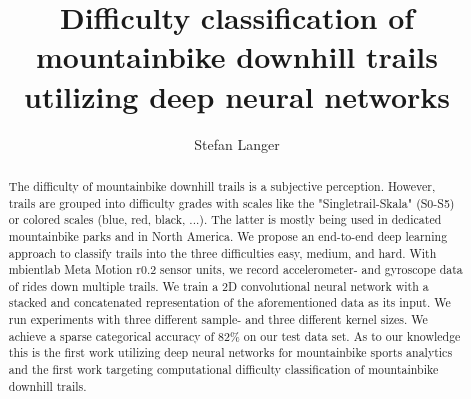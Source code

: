 \documentclass[runningheads]{llncs}
\begin{document}
%
\title{Difficulty classification of mountainbike downhill trails utilizing deep neural networks}
%
%
\author{Stefan Langer}
%
%
%
\maketitle              %
%
\begin{abstract}
The difficulty of mountainbike downhill trails is a subjective perception. 
However, trails are grouped into difficulty grades with scales like the "Singletrail-Skala" (S0-S5) or  colored scales (blue, red, black, ...).
The latter is mostly being used in dedicated mountainbike parks and in North America.
We propose an end-to-end deep learning approach to classify trails into the three difficulties easy, medium, and hard.
With mbientlab Meta Motion r0.2 sensor units, we record accelerometer- and gyroscope data of rides down multiple trails.
We train a 2D convolutional neural network with a stacked and concatenated representation of the aforementioned data as its input.
We run experiments with three different sample- and three different kernel sizes.
We achieve a sparse categorical accuracy of 82\% on our test data set.
As to our knowledge this is the first work utilizing deep neural networks for mountainbike sports analytics and the first work targeting computational difficulty classification of mountainbike downhill trails.


\end{abstract}
%
%
%
\end{document}
